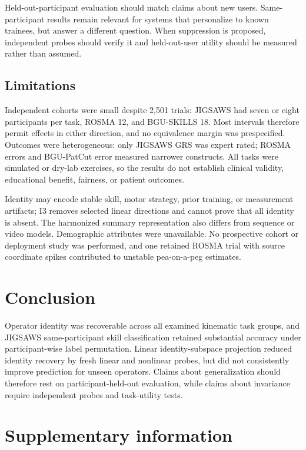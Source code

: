 \documentclass[11pt]{article}
\begin{document}
Held-out-participant evaluation should match claims about new users.
Same-participant results remain relevant for systems that personalize to
known trainees, but answer a different question. When suppression is
proposed, independent probes should verify it and held-out-user utility
should be measured rather than assumed.

\subsection{Limitations}\label{limitations}

Independent cohorts were small despite 2,501 trials: JIGSAWS had seven
or eight participants per task, ROSMA 12, and BGU-SKILLS 18. Most
intervals therefore permit effects in either direction, and no
equivalence margin was prespecified. Outcomes were heterogeneous: only
JIGSAWS GRS was expert rated; ROSMA errors and BGU-PatCut error measured
narrower constructs. All tasks were simulated or dry-lab exercises, so
the results do not establish clinical validity, educational benefit,
fairness, or patient outcomes.

Identity may encode stable skill, motor strategy, prior training, or
measurement artifacts; I3 removes selected linear directions and cannot
prove that all identity is absent. The harmonized summary representation
also differs from sequence or video models. Demographic attributes were
unavailable. No prospective cohort or deployment study was performed,
and one retained ROSMA trial with source coordinate spikes contributed
to unstable pea-on-a-peg estimates.

\section{Conclusion}\label{conclusion}

Operator identity was recoverable across all examined kinematic task
groups, and JIGSAWS same-participant skill classification retained
substantial accuracy under participant-wise label permutation. Linear
identity-subspace projection reduced identity recovery by fresh linear
and nonlinear probes, but did not consistently improve prediction for
unseen operators. Claims about generalization should therefore rest on
participant-held-out evaluation, while claims about invariance require
independent probes and task-utility tests.

\section{Supplementary information}\label{supplementary-information}
\end{document}
